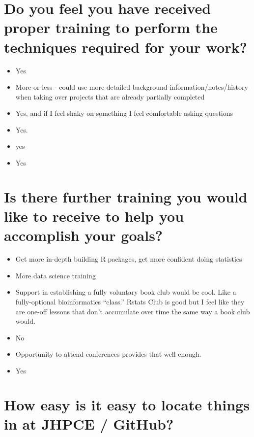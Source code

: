 \documentclass[
]{book}
\providecommand{\tightlist}{%
  \setlength{\itemsep}{0pt}\setlength{\parskip}{0pt}}
\begin{document}
\hypertarget{do-you-feel-you-have-received-proper-training-to-perform-the-techniques-required-for-your-work}{%
\section{Do you feel you have received proper training to perform the techniques required for your work?}\label{do-you-feel-you-have-received-proper-training-to-perform-the-techniques-required-for-your-work}}

\begin{itemize}
\tightlist
\item
  Yes
\item
  More-or-less - could use more detailed background information/notes/history when taking over projects that are already partially completed
\item
  Yes, and if I feel shaky on something I feel comfortable asking questions
\item
  Yes.
\item
  yes
\item
  Yes
\end{itemize}

\hypertarget{is-there-further-training-you-would-like-to-receive-to-help-you-accomplish-your-goals}{%
\section{Is there further training you would like to receive to help you accomplish your goals?}\label{is-there-further-training-you-would-like-to-receive-to-help-you-accomplish-your-goals}}

\begin{itemize}
\tightlist
\item
  Get more in-depth building R packages, get more confident doing statistics
\item
  More data science training
\item
  Support in establishing a fully voluntary book club would be cool. Like a fully-optional bioinformatics ``class.'' Rstats Club is good but I feel like they are one-off lessons that don't accumulate over time the same way a book club would.
\item
  No
\item
  Opportunity to attend conferences provides that well enough.
\item
  Yes
\end{itemize}

\hypertarget{how-easy-is-it-easy-to-locate-things-in-at-jhpce-github}{%
\section{How easy is it easy to locate things in at JHPCE / GitHub?}\label{how-easy-is-it-easy-to-locate-things-in-at-jhpce-github}}
\end{document}

